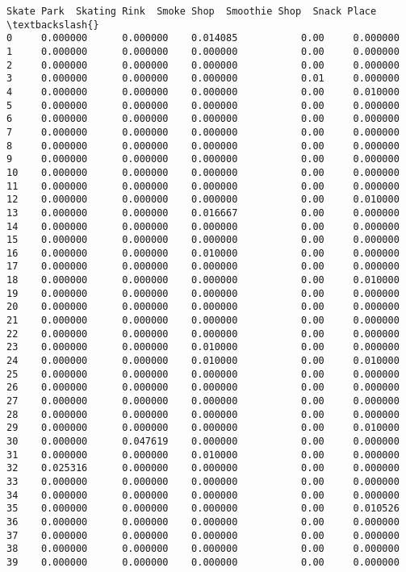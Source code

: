 \documentclass[11pt]{article}
\begin{document}
\begin{tcolorbox}[breakable, size=fbox, boxrule=.5pt, pad at break*=1mm, opacityfill=0]
\begin{Verbatim}[commandchars=\\\{\}]
    Skate Park  Skating Rink  Smoke Shop  Smoothie Shop  Snack Place  \textbackslash{}
0     0.000000      0.000000    0.014085           0.00     0.000000
1     0.000000      0.000000    0.000000           0.00     0.000000
2     0.000000      0.000000    0.000000           0.00     0.000000
3     0.000000      0.000000    0.000000           0.01     0.000000
4     0.000000      0.000000    0.000000           0.00     0.010000
5     0.000000      0.000000    0.000000           0.00     0.000000
6     0.000000      0.000000    0.000000           0.00     0.000000
7     0.000000      0.000000    0.000000           0.00     0.000000
8     0.000000      0.000000    0.000000           0.00     0.000000
9     0.000000      0.000000    0.000000           0.00     0.000000
10    0.000000      0.000000    0.000000           0.00     0.000000
11    0.000000      0.000000    0.000000           0.00     0.000000
12    0.000000      0.000000    0.000000           0.00     0.010000
13    0.000000      0.000000    0.016667           0.00     0.000000
14    0.000000      0.000000    0.000000           0.00     0.000000
15    0.000000      0.000000    0.000000           0.00     0.000000
16    0.000000      0.000000    0.010000           0.00     0.000000
17    0.000000      0.000000    0.000000           0.00     0.000000
18    0.000000      0.000000    0.000000           0.00     0.010000
19    0.000000      0.000000    0.000000           0.00     0.000000
20    0.000000      0.000000    0.000000           0.00     0.000000
21    0.000000      0.000000    0.000000           0.00     0.000000
22    0.000000      0.000000    0.000000           0.00     0.000000
23    0.000000      0.000000    0.010000           0.00     0.000000
24    0.000000      0.000000    0.010000           0.00     0.010000
25    0.000000      0.000000    0.000000           0.00     0.000000
26    0.000000      0.000000    0.000000           0.00     0.000000
27    0.000000      0.000000    0.000000           0.00     0.000000
28    0.000000      0.000000    0.000000           0.00     0.000000
29    0.000000      0.000000    0.000000           0.00     0.010000
30    0.000000      0.047619    0.000000           0.00     0.000000
31    0.000000      0.000000    0.010000           0.00     0.000000
32    0.025316      0.000000    0.000000           0.00     0.000000
33    0.000000      0.000000    0.000000           0.00     0.000000
34    0.000000      0.000000    0.000000           0.00     0.000000
35    0.000000      0.000000    0.000000           0.00     0.010526
36    0.000000      0.000000    0.000000           0.00     0.000000
37    0.000000      0.000000    0.000000           0.00     0.000000
38    0.000000      0.000000    0.000000           0.00     0.000000
39    0.000000      0.000000    0.000000           0.00     0.000000


\end{Verbatim}
\end{tcolorbox}
\end{document}

